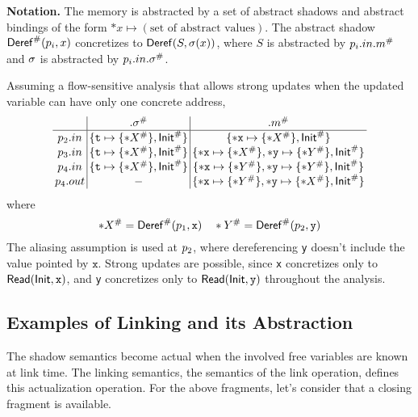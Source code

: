 \documentclass{article}
\begin{document}
\vspace{\topsep}
\noindent\textbf{Notation.}
The memory is abstracted by a set of abstract shadows and
abstract bindings of the form $*x\mapsto(\text{set of abstract values})$.
The abstract shadow ${\mathsf{Deref}}^{\#}(p_i,x)$ concretizes to
$\mathsf{Deref}(S,\sigma(x))$, where $S$ is abstracted by $p_i.{in}.{m}^{\#}$
and $\sigma$ is abstracted by $p_i.{in}.{\sigma}^{\#}$.

\vspace{\topsep}
Assuming a flow-sensitive analysis
that allows strong updates when the updated variable can have only
one concrete address,
\[
  \setlength{\arraycolsep}{2pt}
  \begin{array}{c|c|c}
                             & .\Abs\ctx                                               & .\Abs\mem                                                                                          \\
    \hline
    \ppoint_2.\abbrtext{in}  & \{\texttt{t}\mapsto\{*\Abs{\abbrtext{X}}\},\Abs\InitE\} & \{*\texttt{x}\mapsto\{*\Abs{\abbrtext{X}}\},\Abs\InitE\}                                           \\
    \ppoint_3.\abbrtext{in}  & \{\texttt{t}\mapsto\{*\Abs{\abbrtext{X}}\},\Abs\InitE\} & \{*\texttt{x}\mapsto\{*\Abs{\abbrtext{X}}\},*\texttt{y}\mapsto\{*\Abs{\abbrtext{Y}}\},\Abs\InitE\} \\
    \ppoint_4.\abbrtext{in}  & \{\texttt{t}\mapsto\{*\Abs{\abbrtext{X}}\},\Abs\InitE\} & \{*\texttt{x}\mapsto\{*\Abs{\abbrtext{Y}}\},*\texttt{y}\mapsto\{*\Abs{\abbrtext{Y}}\},\Abs\InitE\} \\
    \ppoint_4.\abbrtext{out} & -                                                       & \{*\texttt{x}\mapsto\{*\Abs{\abbrtext{Y}}\},*\texttt{y}\mapsto\{*\Abs{\abbrtext{X}}\},\Abs\InitE\}
  \end{array}
\]
where
\[*{{X}}^{\#}={\mathsf{Deref}}^{\#}(p_1,\texttt{x})\quad *{{Y}}^{\#}={\mathsf{Deref}}^{\#}(p_2,\texttt{y})\]
The aliasing assumption is used at $p_2$, where dereferencing \texttt{y}
doesn't include the value pointed by $\texttt{x}$.
Strong updates are possible, since \texttt{x} concretizes only to $\mathsf{Read}(\mathsf{Init},\texttt{x})$,
and \texttt{y} concretizes only to $\mathsf{Read}(\mathsf{Init},\texttt{y})$ throughout the analysis.

\subsection{Examples of Linking and its Abstraction}
The shadow semantics become actual when the involved free variables
are known at link time. The linking semantics, the semantics of the link
operation, defines this actualization operation. For the above fragments, let's
consider that a closing fragment is available.
\end{document}

